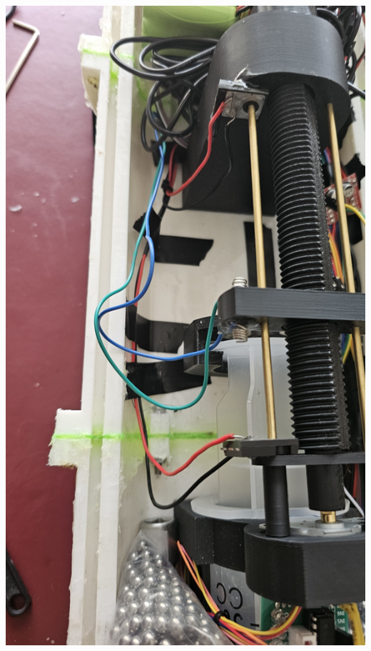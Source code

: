 \documentclass[11pt,a4paper,titlepage]{report}
\begin{document}
	\begin{center}
		\label{picture:images_build_9}
		\includegraphics[width=\linewidth]{assets/AUV_Build9.jpg}
	\end{center}
	
\end{document}
